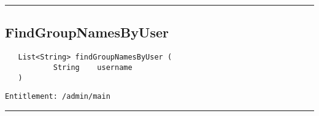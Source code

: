 \rule{12cm}{2pt}
\subsection{FindGroupNamesByUser}
\label{Api:FindGroupNamesByUser}
\begin{verbatim}
   List<String> findGroupNamesByUser (
           String    username
   )
\end{verbatim}
\begin{Verbatim}[fontsize=\small, formatcom=\color{Maroon}]
  Entitlement: /admin/main
\end{Verbatim}



\rule{12cm}{2pt}
